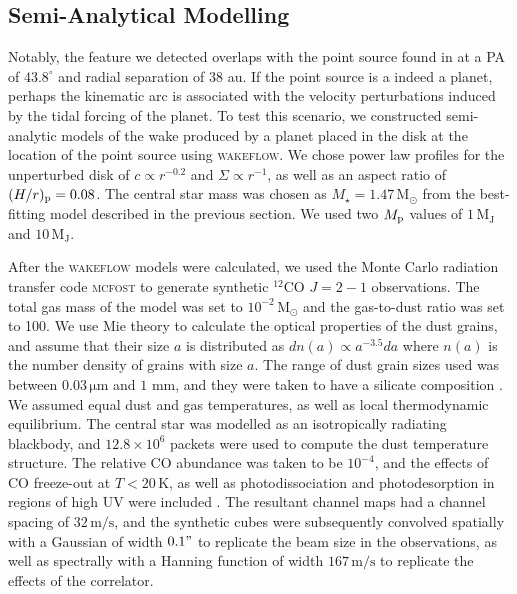 \subsection{Semi-Analytical Modelling} \label{sec:garg_analytics}

Notably, the feature we detected overlaps with the point source found in \citet{gratton2019} at a PA of $43.8^\circ$ and radial separation of $38$ au.
If the point source is a indeed a planet, perhaps the kinematic arc is associated with the velocity perturbations induced by the tidal forcing of the planet.
To test this scenario, we constructed semi-analytic models of the wake produced by a planet placed in the disk at the location of the \citet{gratton2019} point source using \textsc{wakeflow}.
We chose power law profiles for the unperturbed disk of $c \propto r^{-0.2}$ and $\Sigma \propto r^{-1}$, as well as an aspect ratio of $(H/r)_{\rm p}=0.08$.
The central star mass was chosen as $M_\star = 1.47 \, \mathrm{M_\odot}$ from the best-fitting model described in the previous section.
We used two $M_{\rm p}$ values of $1 \, \mathrm{M_J}$ and $10 \, \mathrm{M_J}$.

After the \textsc{wakeflow} models were calculated, we used the Monte Carlo radiation transfer code \textsc{mcfost} \citep{pinte2006,pinte2009} to generate synthetic $^{12}$CO $J=2-1$ observations.
The total gas mass of the model was set to $10^{-2} \, \mathrm{M_\odot}$ \citep{toci2019} and the gas-to-dust ratio was set to 100.
We use Mie theory \citep{mie1908} to calculate the optical properties of the dust grains, and assume that their size $a$ is distributed as $dn(a) \propto a^{-3.5} da$ where $n(a)$ is the number density of grains with size $a$.
The range of dust grain sizes used was between $0.03 \, \mathrm{\mu m}$ and $1$ mm, and they were taken to have a silicate composition \citep{weingartner2001}.
We assumed equal dust and gas temperatures, as well as local thermodynamic equilibrium.
The central star was modelled as an isotropically radiating blackbody, and $12.8\times 10^6$ packets were used to compute the dust temperature structure.
The relative CO abundance was taken to be $10^{-4}$, and the effects of CO freeze-out at $T < 20\, \mathrm{K}$, as well as photodissociation and photodesorption in regions of high UV were included \citep{pinte2018}.
The resultant channel maps had a channel spacing of $32 \, \mathrm{m/s}$, and the synthetic cubes were subsequently convolved spatially with a Gaussian of width $0.1"$ to replicate the beam size in the observations, as well as spectrally with a Hanning function of width $167 \, \mathrm{m/s}$ to replicate the effects of the correlator.

